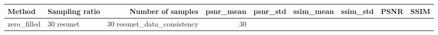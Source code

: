 \begin{tabular}{llrrrrrll}
\toprule
Method & Sampling ratio & Number of samples & psnr_mean & psnr_std & ssim_mean & ssim_std & PSNR & SSIM \\
\midrule
zero_filled & 30%
resunet & 30%
resunet_data_consistency & 30%
\bottomrule
\end{tabular}
